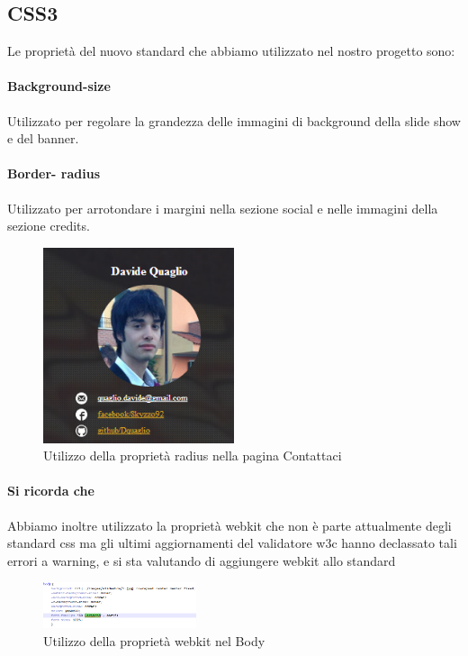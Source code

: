 \subsection{CSS3}

Le proprietà del nuovo standard che abbiamo utilizzato nel nostro progetto sono:

\paragraph{Background-size}

Utilizzato per regolare la grandezza delle immagini di background  della slide show e del banner.

\paragraph{Border- radius}

Utilizzato per arrotondare i margini nella sezione social e nelle immagini della sezione credits.

\begin{figure}[H]
		\centering \includegraphics[width=0.5\textwidth]{images/radius.png}
		\caption{Utilizzo della proprietà radius nella pagina Contattaci}
\end{figure}

\paragraph{Si ricorda che}

Abbiamo inoltre utilizzato la proprietà webkit che non è parte attualmente degli standard css ma gli ultimi aggiornamenti del validatore w3c hanno declassato tali errori a warning, e si sta valutando di aggiungere webkit allo standard

\begin{figure}[H]
		\centering \includegraphics[width=0.4\textwidth]{images/webkit.png}
		\caption{Utilizzo della proprietà webkit nel Body}
\end{figure}

